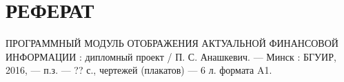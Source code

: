 \section*{РЕФЕРАТ}
\thispagestyle{empty}

ПРОГРАММНЫЙ МОДУЛЬ ОТОБРАЖЕНИЯ АКТУАЛЬНОЙ ФИНАНСОВОЙ ИНФОРМАЦИИ :
дипломный проект / П. С. Анашкевич. --- Минск : БГУИР, 2016, --- п.з. ---
{\color{red} ?? с.}, чертежей (плакатов) --- 6 л. формата A1.








\pagebreak